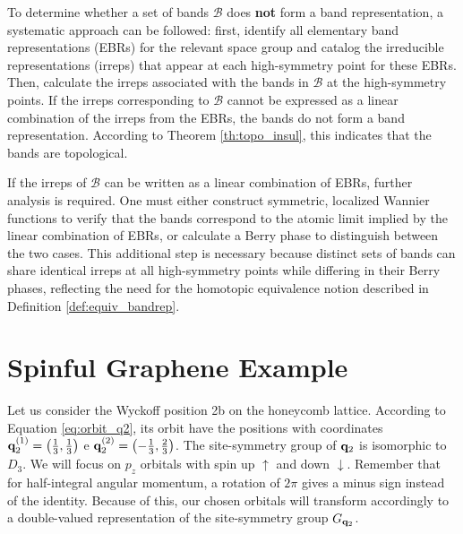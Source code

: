 

To determine whether a set of bands \(\mathcal{B}\) does \textbf{not} form a band representation, a systematic approach can be followed: first, identify all elementary band representations (EBRs) for the relevant space group and catalog the irreducible representations (irreps) that appear at each high-symmetry point for these EBRs. Then, calculate the irreps associated with the bands in \(\mathcal{B}\) at the high-symmetry points. If the irreps corresponding to \(\mathcal{B}\) cannot be expressed as a linear combination of the irreps from the EBRs, the bands do not form a band representation. According to Theorem \ref{th:topo_insul}, this indicates that the bands are topological.

If the irreps of \(\mathcal{B}\) can be written as a linear combination of EBRs, further analysis is required. One must either construct symmetric, localized Wannier functions to verify that the bands correspond to the atomic limit implied by the linear combination of EBRs, or calculate a Berry phase to distinguish between the two cases. This additional step is necessary because distinct sets of bands can share identical irreps at all high-symmetry points while differing in their Berry phases, reflecting the need for the homotopic equivalence notion described in Definition \ref{def:equiv_bandrep}.

\section{Spinful Graphene Example} \label{sec:spinful_graphene}

Let us consider the Wyckoff position 2b on the honeycomb lattice. According to Equation \ref{eq:orbit_q2}, its orbit have the positions with coordinates ${\vb{q}}_2^{(1)} = \qty(\frac{1}{3}, \frac{1}{3})$ e ${\vb{q}}_2^{(2)} = \qty(-\frac{1}{3}, \frac{2}{3})$. The site-symmetry group of ${\vb{q}}_2$ is isomorphic to $D_3$. We will focus on $p_z$ orbitals with spin up $\uparrow$ and down $\downarrow$. Remember that for half-integral angular momentum, a rotation of $2\pi$ gives a minus sign instead of the identity. Because of this, our chosen orbitals will transform accordingly to a double-valued representation of the site-symmetry group $G_{{\vb{q}}_2}$.

